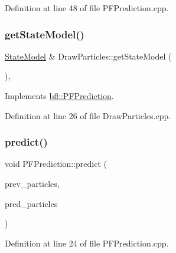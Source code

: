 Definition at line 48 of file P\+F\+Prediction.\+cpp.

\mbox{\label{classbfl_1_1DrawParticles_a7a7ebf5a7ea10747db1bd8ab03390107}} 
\subsubsection{\texorpdfstring{get\+State\+Model()}{getStateModel()}}
{\footnotesize\ttfamily \mbox{\hyperlink{classbfl_1_1StateModel}{State\+Model}} \& Draw\+Particles\+::get\+State\+Model (\begin{DoxyParamCaption}{ }\end{DoxyParamCaption})\hspace{0.3cm}{\ttfamily [override]}, {\ttfamily [virtual]}}



Implements \mbox{\hyperlink{classbfl_1_1PFPrediction_a1a0f7a1d66a6849c2de10459c6b8f8ac}{bfl\+::\+P\+F\+Prediction}}.



Definition at line 26 of file Draw\+Particles.\+cpp.

\mbox{\label{classbfl_1_1PFPrediction_a129dcd1cccd2da9827ef0c49c90b9345}} 
\subsubsection{\texorpdfstring{predict()}{predict()}}
{\footnotesize\ttfamily void P\+F\+Prediction\+::predict (\begin{DoxyParamCaption}\item[{const \mbox{\hyperlink{classbfl_1_1ParticleSet}{bfl\+::\+Particle\+Set}} \&}]{prev\+\_\+particles,  }\item[{\mbox{\hyperlink{classbfl_1_1ParticleSet}{bfl\+::\+Particle\+Set}} \&}]{pred\+\_\+particles }\end{DoxyParamCaption})\hspace{0.3cm}{\ttfamily [inherited]}}



Definition at line 24 of file P\+F\+Prediction.\+cpp.

